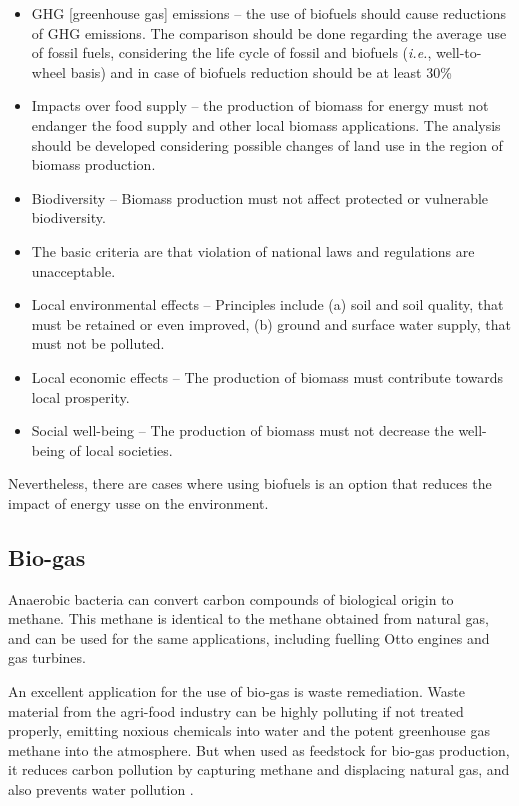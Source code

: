 {\itshape
\begin{itemize}
  \item GHG [greenhouse gas] emissions – the use of biofuels should cause reductions of GHG emissions. The
comparison should be done regarding the average use of fossil fuels, considering the life
cycle of fossil and biofuels (\textit{i.e.}, well-to-wheel basis) and in case of biofuels reduction
should be at least 30\%
 \item Impacts over food supply – the production of biomass for energy must not endanger the
food supply and other local biomass applications. The analysis should be developed
considering possible changes of land use in the region of biomass production.
 \item Biodiversity – Biomass production must not affect protected or vulnerable biodiversity.
 \item The basic criteria are that violation of national laws and regulations are unacceptable.
 \item Local environmental effects – Principles include (a) soil and soil quality, that must be
retained or even improved, (b) ground and surface water supply, that must not be polluted.
 \item Local economic effects – The production of biomass must contribute towards local
prosperity.
 \item  Social well-being – The production of biomass must not decrease the well-being of local societies. 
\end{itemize}
}

Nevertheless, there are cases where using biofuels is an option that reduces the
impact of energy usse on the environment.

\subsection{Bio-gas}

Anaerobic bacteria can convert carbon compounds of biological origin to methane.
This methane is identical to the methane obtained from natural gas, and can be
used for the same applications, including fuelling Otto engines and gas turbines.

An excellent application for the use of bio-gas is waste remediation. Waste
material from the agri-food industry can be highly polluting if not treated
properly, emitting noxious chemicals into water and the potent greenhouse gas
methane into the atmosphere. But when used as feedstock for bio-gas production,
it reduces carbon pollution by capturing methane and displacing natural gas, and
also prevents water pollution \autocite{Venter2014}. 

